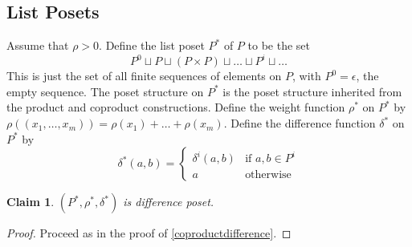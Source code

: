 \documentclass[acmsmall,review,anonymous]{acmart}\settopmatter{printfolios=true,printccs=false,printacmref=false}
\newtheorem{claim}{Claim}
\begin{document}
\subsection{List Posets}
Assume that $\rho > 0$. Define the list poset $P^*$ of $P$ to be the set
$$P^0 \sqcup P \sqcup (P \times P) \sqcup \ldots \sqcup P^i \sqcup \ldots$$
This is just the set of all finite sequences of elements on $P$, with $P^0 =
\epsilon$, the empty sequence. The poset structure on $P^*$ is the poset
structure inherited from the product and coproduct constructions. Define the
weight function $\rho^*$ on $P^*$ by $\rho((x_1, \ldots, x_m)) = \rho(x_1) +
\ldots + \rho(x_m)$. Define the difference function $\delta^*$ on $P^*$ by
$$\delta^*(a, b) =
\begin{cases}
\delta^i(a, b) &\text{if }a, b \in P^i\\
a & \text{otherwise}
\end{cases}$$
\begin{claim}
$(P^*, \rho^*, \delta^*)$ is difference poset.
\end{claim}
\begin{proof}
Proceed as in the proof of \cref{coproductdifference}.
\end{proof}
\end{document}
